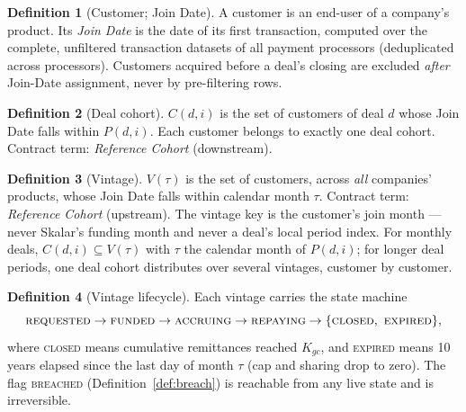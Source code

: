 \documentclass[11pt, a4paper]{article}
\theoremstyle{definition}
\newtheorem{definition}{Definition}[section]
\newcommand{\src}[1]{}
\newcommand{\GCCIA}{upstream facility}
\newcommand{\KCIA}{downstream agreement}
\newcommand{\Kgc}{K_{gc}}                         %
\begin{document}
\begin{definition}[Customer; Join Date]\label{def:customer}
A customer is an end-user of a company's product. Its \emph{Join Date} is the date of its first transaction, computed over the complete, unfiltered transaction datasets of all payment processors (deduplicated across processors). Customers acquired before a deal's closing are excluded \emph{after} Join-Date assignment, never by pre-filtering rows.
\src{\GCCIA{} Sch.~A (``Reference Cohort'': Join Date per Customer Dataset); \KCIA{} Sch.~A (``Reference Cohort'': first transaction date, \texttt{Customer\_Id} / \texttt{rc\_original\_app\_user\_id}).}
\end{definition}

\begin{definition}[Deal cohort]\label{def:dealcohort}
$C(d, i)$ is the set of customers of deal $d$ whose Join Date falls within $P(d, i)$. Each customer belongs to exactly one deal cohort. Contract term: \emph{Reference Cohort} (downstream).
\src{\KCIA{} Sch.~A (``Reference Cohort'').}
\end{definition}

\begin{definition}[Vintage]\label{def:vintage}
$V(\tau)$ is the set of customers, across \emph{all} companies' products, whose Join Date falls within calendar month $\tau$. Contract term: \emph{Reference Cohort} (upstream). The vintage key is the customer's join month --- never Skalar's funding month and never a deal's local period index. For monthly deals, $C(d, i) \subseteq V(\tau)$ with $\tau$ the calendar month of $P(d,i)$; for longer deal periods, one deal cohort distributes over several vintages, customer by customer.
\src{\GCCIA{} Sch.~A (``Reference Cohort'').}
\end{definition}

\begin{definition}[Vintage lifecycle]\label{def:lifecycle}
Each vintage carries the state machine
\[
\textsc{requested} \to \textsc{funded} \to \textsc{accruing} \to \textsc{repaying} \to \{\textsc{closed},\ \textsc{expired}\},
\]
where \textsc{closed} means cumulative remittances reached $\Kgc$, and \textsc{expired} means 10 years elapsed since the last day of month $\tau$ (cap and sharing drop to zero). The flag \textsc{breached} (Definition~\ref{def:breach}) is reachable from any live state and is irreversible.
\src{\GCCIA{} Sch.~A (``Investor Cap Amount'', 10-year proviso; ``Open Reference Cohort'').}
\end{definition}
\end{document}
